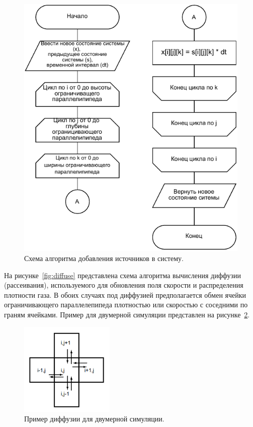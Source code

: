 \begin{figure}[H]
	\centering
	\includegraphics[width=1.0\textwidth, page=1]{assets/img/add_source.pdf}
	\caption{Схема алгоритма добавления источников в систему.}
	\label{fig:add_src}
\end{figure}

На рисунке~\ref{fig:diffuse} представлена схема алгоритма вычисления диффузии (рассеивания), используемого для обновления поля скорости и распределения плотности газа. В обоих случаях под диффузией предполагается обмен ячейки ограничивающего параллелепипеда плотностью или скоростью с соседними по граням ячейками. Пример для двумерной симуляции представлен на рисунке~\ref{fig:diffusion}.

\begin{figure}[H]
	\centering
	\includegraphics[width=0.4\textwidth, page=1]{assets/img/diffusion.png}   
	\caption{Пример диффузии для двумерной симуляции.}
	\label{fig:diffusion}
\end{figure}

